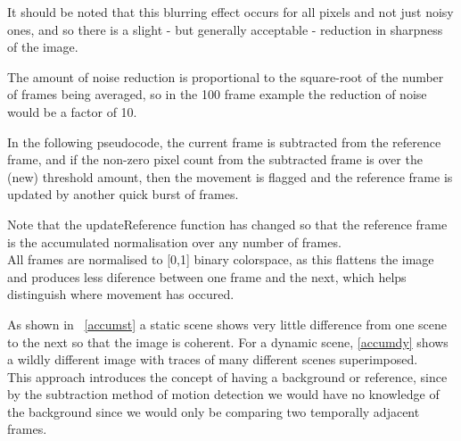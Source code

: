 \documentclass[11pt]{article} %
\begin{document}
{{It should be noted that this blurring effect occurs for all pixels and not just noisy ones, and so there is a slight - but generally acceptable - reduction in sharpness of the image.

The amount of noise reduction is proportional to the square-root of the number of frames being averaged, so in the 100 frame example the reduction of noise would be a factor of 10.

In the following pseudocode, the current frame is subtracted from the reference frame, and if the non-zero pixel count from the subtracted frame is over the (new) threshold amount, then the movement is flagged and the reference frame is updated by another quick burst of frames.

\vspace{-20pt}
\begin{frame}{}
	
\end{frame}

Note that the updateReference function has changed so that the reference frame is the accumulated normalisation over any number of frames. \\
All frames are normalised to [0,1]  binary colorspace, as this flattens the image and produces less diference between one frame and the next, which helps distinguish where movement has occured.

As shown in ~\cref{accumst} a static scene shows very little difference from one scene to the next so that the image is coherent. For a dynamic scene, \cref{accumdy} shows a wildly different image with traces of many different scenes superimposed.
\\This approach introduces the concept of having a background or reference, since by the subtraction method of motion detection we would have no knowledge of the background since we would only be comparing two temporally adjacent frames.

}}
\end{document}
